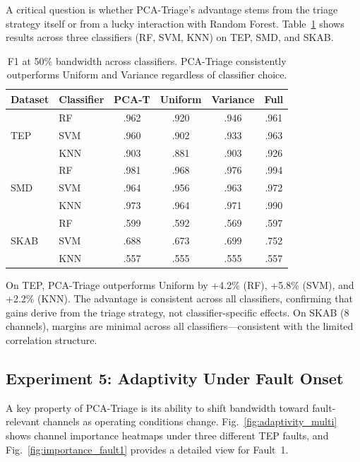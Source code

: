 \documentclass[journal]{IEEEtran}
\begin{document}
A critical question is whether PCA-Triage's advantage stems from the triage strategy itself or from a lucky interaction with Random Forest. Table~\ref{tab:multiclassifier} shows results across three classifiers (RF, SVM, KNN) on TEP, SMD, and SKAB.

\begin{table}[t]
\centering
\caption{F1 at 50\% bandwidth across classifiers. PCA-Triage consistently outperforms Uniform and Variance regardless of classifier choice.}
\begin{tabular}{@{}llcccc@{}}
\toprule
\textbf{Dataset} & \textbf{Classifier} & \textbf{PCA-T} & \textbf{Uniform} & \textbf{Variance} & \textbf{Full} \\
\midrule
\multirow{3}{*}{TEP} & RF & .962 & .920 & .946 & .961 \\
& SVM & .960 & .902 & .933 & .963 \\
& KNN & .903 & .881 & .903 & .926 \\
\midrule
\multirow{3}{*}{SMD} & RF & .981 & .968 & .976 & .994 \\
& SVM & .964 & .956 & .963 & .972 \\
& KNN & .973 & .964 & .971 & .990 \\
\midrule
\multirow{3}{*}{SKAB} & RF & .599 & .592 & .569 & .597 \\
& SVM & .688 & .673 & .699 & .752 \\
& KNN & .557 & .555 & .555 & .557 \\
\bottomrule
\end{tabular}
\label{tab:multiclassifier}
\end{table}

On TEP, PCA-Triage outperforms Uniform by +4.2\% (RF), +5.8\% (SVM), and +2.2\% (KNN). The advantage is consistent across all classifiers, confirming that gains derive from the triage strategy, not classifier-specific effects. On SKAB (8 channels), margins are minimal across all classifiers---consistent with the limited correlation structure.

\subsection{Experiment 5: Adaptivity Under Fault Onset}

A key property of PCA-Triage is its ability to shift bandwidth toward fault-relevant channels as operating conditions change. Fig.~\ref{fig:adaptivity_multi} shows channel importance heatmaps under three different TEP faults, and Fig.~\ref{fig:importance_fault1} provides a detailed view for Fault~1.
\end{document}
